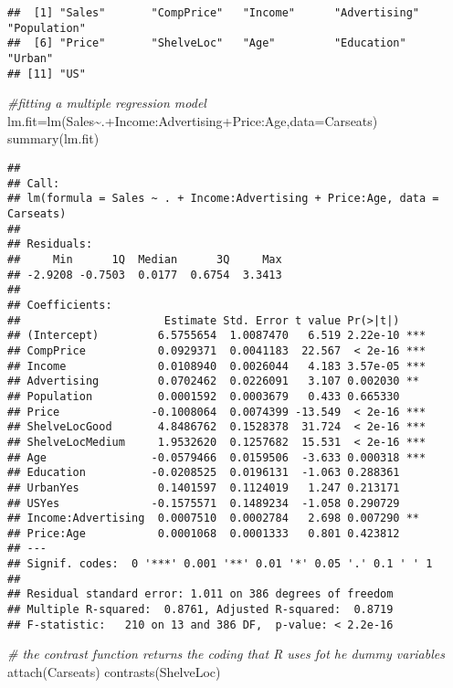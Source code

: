 \documentclass[
]{article}
\newenvironment{Shaded}{\begin{snugshade}}{\end{snugshade}}
\newcommand{\AttributeTok}[1]{\textcolor[rgb]{0.77,0.63,0.00}{#1}}
\newcommand{\CommentTok}[1]{\textcolor[rgb]{0.56,0.35,0.01}{\textit{#1}}}
\newcommand{\FunctionTok}[1]{\textcolor[rgb]{0.00,0.00,0.00}{#1}}
\newcommand{\NormalTok}[1]{#1}
\newcommand{\OtherTok}[1]{\textcolor[rgb]{0.56,0.35,0.01}{#1}}
\newcommand{\SpecialCharTok}[1]{\textcolor[rgb]{0.00,0.00,0.00}{#1}}
\begin{document}
\begin{verbatim}
##  [1] "Sales"       "CompPrice"   "Income"      "Advertising" "Population" 
##  [6] "Price"       "ShelveLoc"   "Age"         "Education"   "Urban"      
## [11] "US"
\end{verbatim}

\begin{Shaded}
\begin{Highlighting}[]
\CommentTok{\#fitting a multiple regression model}
\NormalTok{lm.fit}\OtherTok{=}\FunctionTok{lm}\NormalTok{(Sales}\SpecialCharTok{\textasciitilde{}}\NormalTok{.}\SpecialCharTok{+}\NormalTok{Income}\SpecialCharTok{:}\NormalTok{Advertising}\SpecialCharTok{+}\NormalTok{Price}\SpecialCharTok{:}\NormalTok{Age,}\AttributeTok{data=}\NormalTok{Carseats)}
\FunctionTok{summary}\NormalTok{(lm.fit)}
\end{Highlighting}
\end{Shaded}

\begin{verbatim}
## 
## Call:
## lm(formula = Sales ~ . + Income:Advertising + Price:Age, data = Carseats)
## 
## Residuals:
##     Min      1Q  Median      3Q     Max 
## -2.9208 -0.7503  0.0177  0.6754  3.3413 
## 
## Coefficients:
##                      Estimate Std. Error t value Pr(>|t|)    
## (Intercept)         6.5755654  1.0087470   6.519 2.22e-10 ***
## CompPrice           0.0929371  0.0041183  22.567  < 2e-16 ***
## Income              0.0108940  0.0026044   4.183 3.57e-05 ***
## Advertising         0.0702462  0.0226091   3.107 0.002030 ** 
## Population          0.0001592  0.0003679   0.433 0.665330    
## Price              -0.1008064  0.0074399 -13.549  < 2e-16 ***
## ShelveLocGood       4.8486762  0.1528378  31.724  < 2e-16 ***
## ShelveLocMedium     1.9532620  0.1257682  15.531  < 2e-16 ***
## Age                -0.0579466  0.0159506  -3.633 0.000318 ***
## Education          -0.0208525  0.0196131  -1.063 0.288361    
## UrbanYes            0.1401597  0.1124019   1.247 0.213171    
## USYes              -0.1575571  0.1489234  -1.058 0.290729    
## Income:Advertising  0.0007510  0.0002784   2.698 0.007290 ** 
## Price:Age           0.0001068  0.0001333   0.801 0.423812    
## ---
## Signif. codes:  0 '***' 0.001 '**' 0.01 '*' 0.05 '.' 0.1 ' ' 1
## 
## Residual standard error: 1.011 on 386 degrees of freedom
## Multiple R-squared:  0.8761, Adjusted R-squared:  0.8719 
## F-statistic:   210 on 13 and 386 DF,  p-value: < 2.2e-16
\end{verbatim}

\begin{Shaded}
\begin{Highlighting}[]
\CommentTok{\# the contrast function returns the coding that R uses fot he dummy variables}
\FunctionTok{attach}\NormalTok{(Carseats)}
\FunctionTok{contrasts}\NormalTok{(ShelveLoc)}
\end{Highlighting}
\end{Shaded}
\end{document}
